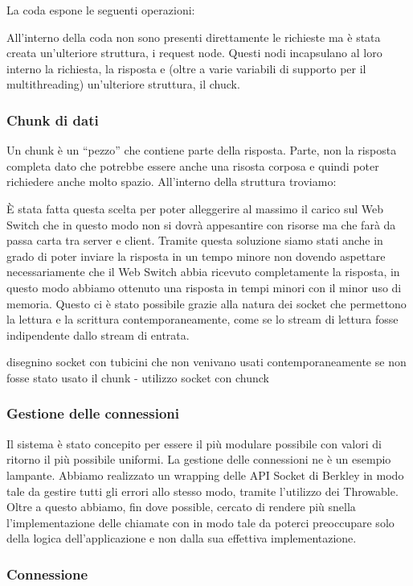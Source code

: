 \documentclass[italian]{tktltiki2}
\begin{document}
La coda espone le seguenti operazioni:

All'interno della coda non sono presenti direttamente le richieste ma è stata creata un'ulteriore struttura, i request node. Questi nodi incapsulano al loro interno la richiesta, la risposta e (oltre a varie variabili di supporto per il multithreading) un'ulteriore struttura, il chuck. 
\subsubsection*{Chunk di dati}
\label{sec:chunk}
Un chunk è un ``pezzo'' che contiene parte della risposta. Parte, non la risposta completa dato che potrebbe essere anche una risosta corposa e quindi poter richiedere anche molto spazio. All'interno della struttura troviamo:

È stata fatta questa scelta per poter alleggerire al massimo il carico sul Web Switch che in questo modo non si dovrà appesantire con risorse ma che farà da passa carta tra server e client. Tramite questa soluzione siamo stati anche in grado di poter inviare la risposta in un tempo minore non dovendo aspettare necessariamente che il Web Switch abbia ricevuto completamente la risposta, in questo modo abbiamo ottenuto una risposta in tempi minori con il minor uso di memoria. Questo ci è stato possibile grazie alla natura dei socket che permettono la lettura e la scrittura contemporaneamente, come se lo stream di lettura fosse indipendente dallo stream di entrata.

disegnino socket con tubicini che non venivano usati contemporaneamente se non fosse stato usato il chunk -  utilizzo socket con chunck
\subsubsection{Gestione delle connessioni}
Il sistema è stato concepito per essere il più modulare possibile con valori di ritorno il più possibile uniformi. La gestione delle connessioni ne è un esempio lampante. Abbiamo realizzato un wrapping delle API Socket di Berkley in modo tale da gestire tutti gli errori allo stesso modo, tramite l'utilizzo dei Throwable. Oltre a questo abbiamo, fin dove possible, cercato di rendere più snella l'implementazione delle chiamate con  in modo tale da poterci preoccupare solo della logica dell'applicazione e non dalla sua effettiva implementazione. 
\subsubsection*{Connessione}
\end{document}

